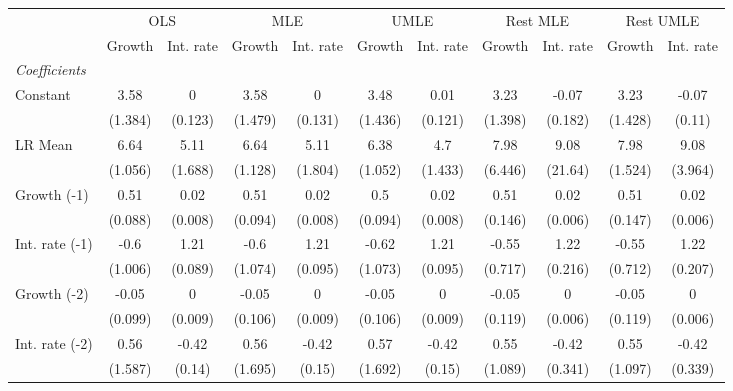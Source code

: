 \begin{table}[htbp] 
	\centering
	\begin{tabular}{@{\extracolsep{4pt}}lcccccccccc@{}}		\hline\hline
		 		 & \multicolumn{2}{c}{OLS} &\multicolumn{2}{c}{MLE} &\multicolumn{2}{c}{UMLE} &\multicolumn{2}{c}{Rest MLE} &\multicolumn{2}{c}{Rest UMLE} \\ 
 		 & Growth 	 & Int. rate 	 & Growth 	 & Int. rate 	 & Growth 	 & Int. rate 	 & Growth 	 & Int. rate 	 & Growth 	 & Int. rate\\\cline{2-3}\cline{4-5}\cline{6-7}\cline{8-9}\cline{10-11}
\rule{0pt}{4ex} 
 \emph{Coefficients} 	  		 & 		 & 		 & 		 & 		 & 		 & 		 & 		 & 		 & 		 &\\ 
\quad Constant 	 & 3.58 	 & 0 	 & 3.58 	 & 0 	 & 3.48 	 & 0.01 	 & 3.23 	 & -0.07 	 & 3.23 	 & -0.07	 \\ 
 		 & (1.384) 	 & (0.123) 	 & (1.479) 	 & (0.131) 	 & (1.436) 	 & (0.121) 	 & (1.398) 	 & (0.182) 	 & (1.428) 	 & (0.11) 	 \\ 
\quad LR Mean 	 & 6.64 	 & 5.11 	 & 6.64 	 & 5.11 	 & 6.38 	 & 4.7 	 & 7.98 	 & 9.08 	 & 7.98 	 & 9.08	 \\ 
 		 & (1.056) 	 & (1.688) 	 & (1.128) 	 & (1.804) 	 & (1.052) 	 & (1.433) 	 & (6.446) 	 & (21.64) 	 & (1.524) 	 & (3.964) 	 \\ 
\quad Growth (-1) 	 &0.51 	 & 0.02 	 & 0.51 	 & 0.02 	 & 0.5 	 & 0.02 	 & 0.51 	 & 0.02 	 & 0.51 	 & 0.02	 \\ 
 		 & (0.088) 	 & (0.008) 	 & (0.094) 	 & (0.008) 	 & (0.094) 	 & (0.008) 	 & (0.146) 	 & (0.006) 	 & (0.147) 	 & (0.006) 	 \\ 
\quad Int. rate (-1) 	 &-0.6 	 & 1.21 	 & -0.6 	 & 1.21 	 & -0.62 	 & 1.21 	 & -0.55 	 & 1.22 	 & -0.55 	 & 1.22	 \\ 
 		 & (1.006) 	 & (0.089) 	 & (1.074) 	 & (0.095) 	 & (1.073) 	 & (0.095) 	 & (0.717) 	 & (0.216) 	 & (0.712) 	 & (0.207) 	 \\ 
\quad Growth (-2) 	 &-0.05 	 & 0 	 & -0.05 	 & 0 	 & -0.05 	 & 0 	 & -0.05 	 & 0 	 & -0.05 	 & 0	 \\ 
 		 & (0.099) 	 & (0.009) 	 & (0.106) 	 & (0.009) 	 & (0.106) 	 & (0.009) 	 & (0.119) 	 & (0.006) 	 & (0.119) 	 & (0.006) 	 \\ 
\quad Int. rate (-2) 	 &0.56 	 & -0.42 	 & 0.56 	 & -0.42 	 & 0.57 	 & -0.42 	 & 0.55 	 & -0.42 	 & 0.55 	 & -0.42	 \\ 
 		 & (1.587) 	 & (0.14) 	 & (1.695) 	 & (0.15) 	 & (1.692) 	 & (0.15) 	 & (1.089) 	 & (0.341) 	 & (1.097) 	 & (0.339) 	 \\ 

\end{tabular}
\end{table}

